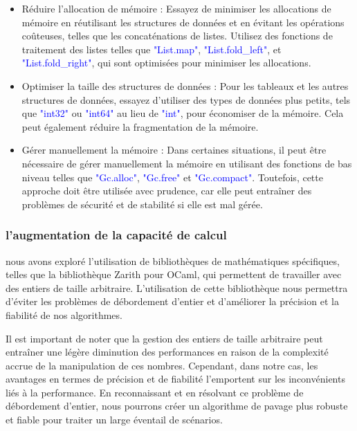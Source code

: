 \documentclass{article}
\begin{document}
\begin{itemize}
  \item Réduire l'allocation de mémoire : Essayez de minimiser les allocations de mémoire en réutilisant les structures de données et en évitant les opérations coûteuses, telles que les concaténations de listes. Utilisez des fonctions de traitement des listes telles que \textcolor{blue}{"List.map"}, \textcolor{blue}{"List.fold\_left"}, et \textcolor{blue}{"List.fold\_right"}, qui sont optimisées pour minimiser les allocations.\newline
  \item Optimiser la taille des structures de données : Pour les tableaux et les autres structures de données, essayez d'utiliser des types de données plus petits, tels que \textcolor{blue}{"int32"} ou \textcolor{blue}{"int64"} au lieu de \textcolor{blue}{"int"}, pour économiser de la mémoire. Cela peut également réduire la fragmentation de la mémoire.\newline
  \item Gérer manuellement la mémoire : Dans certaines situations, il peut être nécessaire de gérer manuellement la mémoire en utilisant des fonctions de bas niveau telles que \textcolor{blue}{"Gc.alloc"}, \textcolor{blue}{"Gc.free"} et \textcolor{blue}{"Gc.compact"}. Toutefois, cette approche doit être utilisée avec prudence, car elle peut entraîner des problèmes de sécurité et de stabilité si elle est mal gérée.\newline
\end{itemize}
\subsubsection{l'augmentation de la capacité de calcul}
nous avons exploré l'utilisation de bibliothèques de mathématiques spécifiques, telles que la bibliothèque Zarith pour OCaml, qui permettent de travailler avec des entiers de taille arbitraire. L'utilisation de cette bibliothèque nous permettra d'éviter les problèmes de débordement d'entier et d'améliorer la précision et la fiabilité de nos algorithmes.\newline

Il est important de noter que la gestion des entiers de taille arbitraire peut entraîner une légère diminution des performances en raison de la complexité accrue de la manipulation de ces nombres. Cependant, dans notre cas, les avantages en termes de précision et de fiabilité l'emportent sur les inconvénients liés à la performance. En reconnaissant et en résolvant ce problème de débordement d'entier, nous pourrons créer un algorithme de pavage plus robuste et fiable pour traiter un large éventail de scénarios.\newline
\end{document}
